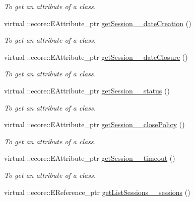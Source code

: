 \begin{DoxyCompactItemize}
\begin{DoxyCompactList}\small\item\em To get an attribute of a class. \item\end{DoxyCompactList}\item 
virtual ::ecore::EAttribute\_\-ptr \hyperlink{classUMS__Data_1_1UMS__DataPackage_a6172f69fd97924a08f374f8c1e2476ed}{getSession\_\-\_\-dateCreation} ()
\begin{DoxyCompactList}\small\item\em To get an attribute of a class. \item\end{DoxyCompactList}\item 
virtual ::ecore::EAttribute\_\-ptr \hyperlink{classUMS__Data_1_1UMS__DataPackage_a3fee9c0b07b2d819564ff75aa781daa9}{getSession\_\-\_\-dateClosure} ()
\begin{DoxyCompactList}\small\item\em To get an attribute of a class. \item\end{DoxyCompactList}\item 
virtual ::ecore::EAttribute\_\-ptr \hyperlink{classUMS__Data_1_1UMS__DataPackage_a3137b0b5ffc3d56742b184f9f13e2a0d}{getSession\_\-\_\-status} ()
\begin{DoxyCompactList}\small\item\em To get an attribute of a class. \item\end{DoxyCompactList}\item 
virtual ::ecore::EAttribute\_\-ptr \hyperlink{classUMS__Data_1_1UMS__DataPackage_ab2b6e4935754d37c7bb6b6f76cd6ca8c}{getSession\_\-\_\-closePolicy} ()
\begin{DoxyCompactList}\small\item\em To get an attribute of a class. \item\end{DoxyCompactList}\item 
virtual ::ecore::EAttribute\_\-ptr \hyperlink{classUMS__Data_1_1UMS__DataPackage_a30ba70d19aa3766c347d0b0fe63c9e95}{getSession\_\-\_\-timeout} ()
\begin{DoxyCompactList}\small\item\em To get an attribute of a class. \item\end{DoxyCompactList}\item 
virtual ::ecore::EReference\_\-ptr \hyperlink{classUMS__Data_1_1UMS__DataPackage_a59dea7a15471ad2c64d80e1a7f4b8894}{getListSessions\_\-\_\-sessions} ()

\end{DoxyCompactItemize}

